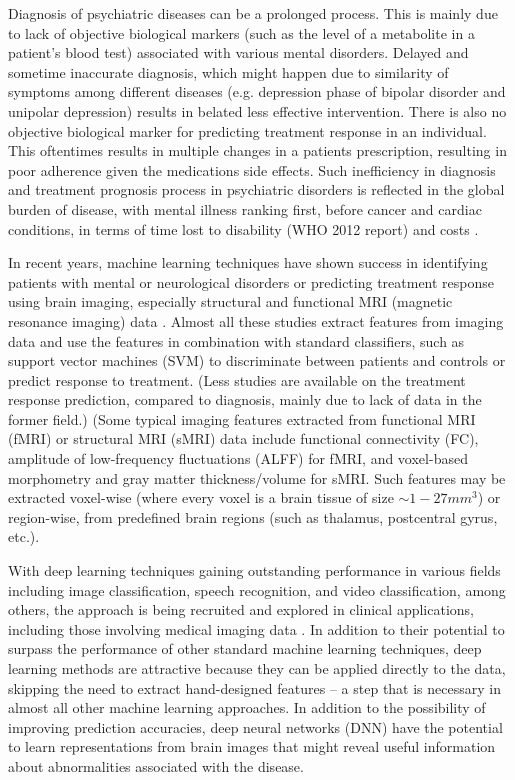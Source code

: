 \documentclass{article}
\begin{document}
Diagnosis of psychiatric diseases can be a prolonged process. This is mainly due to lack of objective biological markers (such as the level of a metabolite in a patient's blood test) associated with various mental disorders. Delayed and sometime inaccurate diagnosis, which might happen due to similarity of symptoms among different diseases (e.g. depression phase of bipolar disorder and unipolar depression) results in belated less effective intervention. There is also no objective biological marker for predicting treatment response in an individual. This oftentimes results in multiple changes in a patients prescription, resulting in poor adherence given the medications side effects. Such inefficiency in diagnosis and treatment prognosis process in psychiatric disorders is reflected in the global burden of disease, with mental illness ranking first, before cancer and cardiac conditions, in terms of time lost to disability (WHO 2012 report) and costs \citep{Roehrig2016}.

In recent years, machine learning techniques have shown success in identifying patients with mental or neurological disorders or predicting treatment response using brain imaging, especially structural and functional MRI (magnetic resonance imaging) data \citep{Orru2012, Zarogianni2013, Koutsouleris2016, Vieira2017, Gheiratmand2017}. Almost all these studies extract features from imaging data and use the features in combination with standard classifiers, such as support vector machines (SVM) \citep{Orru2012, Wolfers2015} to discriminate between patients and controls or predict response to treatment. (Less studies are available on the treatment response prediction, compared to diagnosis, mainly due to lack of data in the former field.) (Some typical imaging features extracted from functional MRI (fMRI) or structural MRI (sMRI) data include functional connectivity (FC), amplitude of low-frequency fluctuations (ALFF) for fMRI, and voxel-based morphometry and gray matter thickness/volume for sMRI. Such features may be extracted voxel-wise (where every voxel is a brain tissue of size $ \sim 1-27 mm^3$) or region-wise, from predefined brain regions (such as thalamus, postcentral gyrus, etc.).

With deep learning techniques gaining outstanding performance in various fields including image classification, speech recognition, and video classification, among others, the approach is being recruited and explored in clinical applications, including those involving medical imaging data \citep{Shen2017, Litjens2017, Gulshan2016}. In addition to their potential to surpass the performance of other standard machine learning techniques, deep learning  methods are attractive because they can be applied directly to the data, skipping the need to extract hand-designed features – a step that is necessary in almost all other machine learning approaches. In addition to the possibility of improving prediction accuracies, deep neural networks (DNN) have the potential to learn representations from brain images that might reveal useful information about abnormalities associated with the disease.
\end{document}
